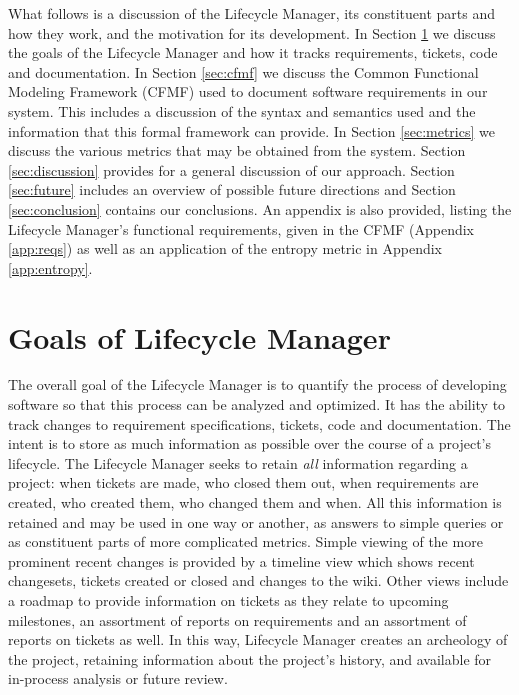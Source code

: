 \documentclass[letterpaper,10pt]{article}
\begin{document}
        What follows is a discussion of the Lifecycle Manager, its
        constituent parts and how they work, and the motivation for
        its development.  In Section \ref{sec:goals} we discuss the
        goals of the Lifecycle Manager and how it tracks requirements,
        tickets, code and documentation.  In Section \ref{sec:cfmf} we
        discuss the Common Functional Modeling Framework (CFMF) used
        to document software requirements in our system.  This
        includes a discussion of the syntax and semantics used and the
        information that this formal framework can provide.  In
        Section \ref{sec:metrics} we discuss the various metrics that
        may be obtained from the system.  Section \ref{sec:discussion}
        provides for a general discussion of our approach.  Section
        \ref{sec:future} includes an overview of possible future
        directions and Section \ref{sec:conclusion} contains our
        conclusions.  An appendix is also provided, listing the Lifecycle
        Manager's functional requirements, given in the CFMF (Appendix
        \ref{app:reqs}) as well as an application of the entropy
        metric in Appendix \ref{app:entropy}.

	\section{Goals of Lifecycle Manager}
        \label{sec:goals}

        The overall goal of the Lifecycle Manager is to quantify the
        process of developing software so that this process can be
        analyzed and optimized. It has the ability to track changes to
        requirement specifications, tickets, code and documentation.
        The intent is to store as much information as possible over
        the course of a project's lifecycle.  The Lifecycle Manager
        seeks to retain \emph{all} information regarding a project:
        when tickets are made, who closed them out, when requirements
        are created, who created them, who changed them and when.  All
        this information is retained and may be used in one way or
        another, as answers to simple queries or as constituent parts
        of more complicated metrics.  Simple viewing of the more
        prominent recent changes is provided by a timeline view which
        shows recent changesets, tickets created or closed and changes
        to the wiki.  Other views include a roadmap to provide
        information on tickets as they relate to upcoming milestones,
        an assortment of reports on requirements and an assortment of
        reports on tickets as well.  In this way, Lifecycle Manager
        creates an archeology of the project, retaining information
        about the project's history, and available for in-process
        analysis or future review.
\end{document}
